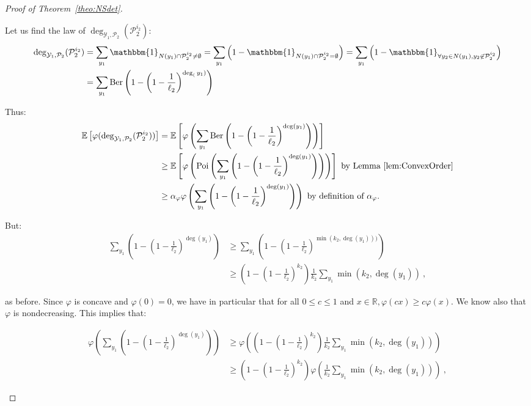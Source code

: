 \begin{proof}[Proof of Theorem~\ref{theo:NSdet}]
\begin{enumerate}
Let us find the law of $\deg_{\mathcal{Y}_1,\mathcal{P}_2}(\mathcal{P}_2^{i_2})$:
  \begin{equation}
    \begin{aligned}
      \deg_{\mathcal{Y}_1,\mathcal{P}_2}(\mathcal{P}_2^{i_2}) &= \sum_{y_1} \mathbbm{1}_{N(y_1) \cap \mathcal{P}_2^{i_2} \not= \emptyset} = \sum_{y_1} \left(1-\mathbbm{1}_{N(y_1) \cap \mathcal{P}_2^{i_2} = \emptyset}\right) = \sum_{y_1} \left(1-\mathbbm{1}_{\forall y_2 \in N(y_1), y_2 \not\in \mathcal{P}_2^{i_2}}\right)\\
      &= \sum_{y_1} \Ber\left(1-\left(1-\frac{1}{\ell_2}\right)^{\deg_(y_1)}\right)
    \end{aligned}
  \end{equation}

Thus:
\begin{equation}
  \begin{aligned}
    \mathbb{E}\left[\varphi(\deg_{\mathcal{Y}_1,\mathcal{P}_2}(\mathcal{P}_2^{i_2}))\right] &= \mathbb{E}\left[\varphi\left(\sum_{y_1}\operatorname{\text{Ber}}\left(1-\left(1-\frac{1}{\ell_2}\right)^{\deg(y_1)}\right)\right)\right]\\
    &\geq  \mathbb{E}\left[\varphi\left(\operatorname{\text{Poi}}\left(\sum_{y_1}\left(1-\left(1-\frac{1}{\ell_2}\right)^{\deg(y_1)}\right)\right)\right)\right] \text{ by Lemma~\ref{lem:ConvexOrder}}\\
    &\geq \alpha_{\varphi}\varphi\left(\sum_{y_1}\left(1-\left(1-\frac{1}{\ell_2}\right)^{\deg(y_1)}\right)\right) \text{ by definition of $\alpha_{\varphi}$.}
  \end{aligned}
\end{equation}

But:
\begin{equation}
  \begin{aligned}
    \sum_{y_1}\left(1-\left(1-\frac{1}{\ell_2}\right)^{\deg(y_1)}\right) &\geq \sum_{y_1}\left(1-\left(1-\frac{1}{\ell_2}\right)^{\min\left(k_2,\deg(y_1)\right))}\right)\\
    &\geq \left(1-\left(1-\frac{1}{\ell_2}\right)^{k_2}\right)\frac{1}{k_2}\sum_{y_1}\min\left(k_2,\deg(y_1)\right) \ ,
  \end{aligned}
\end{equation}

as before. Since $\varphi$ is concave and $\varphi(0)=0$, we have in particular that for all $0 \leq c \leq 1$ and $x \in \mathbb{R}, \varphi(cx)\geq c\varphi(x)$. We know also that $\varphi$ is nondecreasing. This implies that:

\begin{equation}
  \begin{aligned}
\varphi\left(\sum_{y_1}\left(1-\left(1-\frac{1}{\ell_2}\right)^{\deg(y_1)}\right)\right) &\geq \varphi\left(\left(1-\left(1-\frac{1}{\ell_2}\right)^{k_2}\right)\frac{1}{k_2}\sum_{y_1}\min\left(k_2,\deg(y_1)\right)\right) \\
&\geq \left(1-\left(1-\frac{1}{\ell_2}\right)^{k_2}\right)\varphi\left(\frac{1}{k_2}\sum_{y_1}\min\left(k_2,\deg(y_1)\right)\right) \ ,
  \end{aligned}
\end{equation}


\end{enumerate}
\end{proof}
